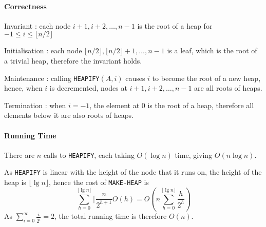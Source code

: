 \documentclass[10pt]{article}
\begin{document}
\paragraph{Correctness}
\begin{description*}
	\item[Invariant]: each node $i+1,i+2,\ldots,n-1$ is the root of a heap for $-1\le i\le\lfloor n/2\rfloor$
	\item[Initialisation]: each node $\lfloor n/2\rfloor,\lfloor n/2\rfloor+1,\ldots,n-1$ is a leaf, which is the root of a trivial heap, therefore the invariant holds.
	\item[Maintenance]: calling \texttt{HEAPIFY}$(A,i)$ causes $i$ to become the root of a new heap, hence, when $i$ is decremented, nodes at $i+1,i+2,\ldots,n-1$ are all roots of heaps.
	\item[Termination]: when $i=-1$, the element at $0$ is the root of a heap, therefore all elements below it are also roots of heaps.
\end{description*}
\paragraph{Running Time}There are $n$ calls to \texttt{HEAPIFY}, each taking $O(\log n)$ time, giving $O(n\log n)$.

As \texttt{HEAPIFY} is linear with the height of the node that it runs on, the height of the heap is $\lfloor \lg n\rfloor$, hence the cost of \texttt{MAKE-HEAP} is
\[\sum_{h=0}^{\lfloor \lg n\rfloor}\lceil \frac{n}{2^{h+1}}O(h)=O\left(n\sum_{h=0}^{\lfloor \lg n\rfloor} \frac{h}{2^h}\right)\]As $\sum_{i=0}^\infty \frac i{2^i}=2$, the total running time is therefore $O(n)$.
\end{document}
